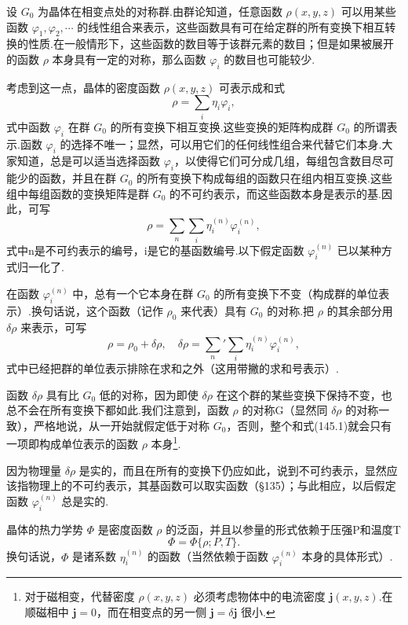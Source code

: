 设 $G_0$ 为晶体在相变点处的对称群.由群论知道，任意函数 $\rho(x,y,z)$ 可以用某些函数 $\varphi_1,\varphi_2,\cdots$ 的线性组合来表示，这些函数具有可在给定群的所有变换下相互转换的性质.在一般情形下，这些函数的数目等于该群元素的数目；但是如果被展开的函数 $\rho$ 本身具有一定的对称，那么函数 $\varphi_i$ 的数目也可能较少.

考虑到这一点，晶体的密度函数 $\rho(x,y,z)$ 可表示成和式
\begin{equation*}
  \rho=\sum_i\eta_i\varphi_i,
\end{equation*}
式中函数 $\varphi_i$ 在群 $G_0$ 的所有变换下相互变换.这些变换的矩阵构成群 $G_0$ 的所谓表示.函数 $\varphi_i$ 的选择不唯一；显然，可以用它们的任何线性组合来代替它们本身.大家知道，总是可以适当选择函数 $\varphi_i$，以使得它们可分成几组，每组包含数目尽可能少的函数，并且在群 $G_0$ 的所有变换下构成每组的函数只在组内相互变换.这些组中每组函数的变换矩阵是群 $G_0$ 的不可约表示，而这些函数本身是表示的基.因此，可写
\begin{equation}
  \rho=\sum_n\sum_i\eta_i^{(n)}\varphi_i^{(n)},
\end{equation}
式中n是不可约表示的编号，i是它的基函数编号.以下假定函数 $\varphi_i^{(n)}$ 已以某种方式归一化了.

在函数 $\varphi_i^{(n)}$ 中，总有一个它本身在群 $G_0$ 的所有变换下不变（构成群的单位表示）.换句话说，这个函数（记作 $\rho_0$ 来代表）具有 $G_0$ 的对称.把 $\rho$ 的其余部分用 $\delta\rho$ 来表示，可写
\begin{equation}
  \rho=\rho_0+\delta\rho,\quad
  \delta\rho=\sum_n'\sum_i\eta_i^{(n)}\varphi_i^{(n)},
\end{equation}
式中已经把群的单位表示排除在求和之外（这用带撇的求和号表示）.

函数 $\delta\rho$ 具有比 $G_0$ 低的对称，因为即使 $\delta\rho$ 在这个群的某些变换下保持不变，也总不会在所有变换下都如此.我们注意到，函数 $\rho$ 的对称G（显然同 $\delta\rho$ 的对称一致），严格地说，从一开始就假定低于对称 $G_0$，否则，整个和式(145.1)就会只有一项即构成单位表示的函数 $\rho$ 本身\footnote{对于磁相变，代替密度 $\rho(x,y,z)$ 必须考虑物体中的电流密度 $\boldsymbol{j}(x,y,z)$.在顺磁相中 $\boldsymbol{j}=0$，而在相变点的另一侧 $\boldsymbol{j}=\delta\boldsymbol{j}$ 很小.}.

因为物理量 $\delta\rho$ 是实的，而且在所有的变换下仍应如此，说到不可约表示，显然应该指物理上的不可约表示，其基函数可以取实函数（§135）；与此相应，以后假定函数 $\varphi_i^{(n)}$ 总是实的.

晶体的热力学势 $\Phi$ 是密度函数 $\rho$ 的泛函，并且以参量的形式依赖于压强P和温度T
\begin{equation*}
  \Phi=\Phi\{\rho;P,T\}.
\end{equation*}
换句话说，$\Phi$ 是诸系数 $\eta_i^{(n)}$ 的函数（当然依赖于函数 $\varphi_i^{(n)}$ 本身的具体形式）.

